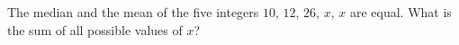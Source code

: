 The median and the mean of the five integers $10$, $12$, $26$, $x$, $x$ are equal. What is the sum of all possible values of $x$?
